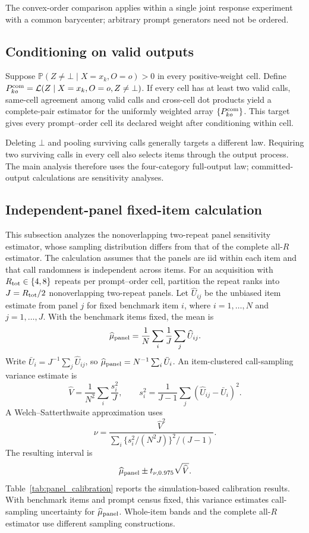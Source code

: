 \documentclass[letterpaper]{article}
\newcommand{\Law}{\mathcal L}
\newcommand{\Prob}{\mathbb P}
\newcommand{\1}{\mathbf 1}
\begin{document}
The convex-order comparison applies within a single joint response experiment
with a common barycenter; arbitrary prompt generators need not be ordered.

\subsection{Conditioning on valid outputs}

Suppose
$\Prob(Z\ne\bot\mid X=x_k,O=o)>0$ in every positive-weight cell. Define
$P_{ko}^{\rm com}=\Law(Z\mid X=x_k,O=o,Z\ne\bot)$. If every cell has at
least two valid calls, same-cell agreement among valid calls and cross-cell
dot products yield a complete-pair estimator for the uniformly weighted
array $\{P_{ko}^{\rm com}\}$. This target gives every prompt--order cell its
declared weight after conditioning within cell.

Deleting $\bot$ and pooling surviving calls generally targets a different law.
Requiring two surviving calls in every cell also selects items through the
output process. The main analysis therefore uses the four-category
full-output law; committed-output calculations are sensitivity analyses.

\subsection{Independent-panel fixed-item calculation}

This subsection analyzes the nonoverlapping two-repeat panel sensitivity
estimator, whose sampling distribution differs from that of the complete
all-$R$ estimator. The calculation assumes that the panels are iid within each
item and that call randomness is independent across items. For an acquisition with
$R_{\rm tot}\in\{4,8\}$ repeats per prompt--order cell, partition the repeat
ranks into $J=R_{\rm tot}/2$ nonoverlapping two-repeat panels. Let
$\widehat U_{ij}$ be the unbiased item estimate from panel $j$ for fixed
benchmark item $i$, where $i=1,\ldots,N$ and $j=1,\ldots,J$. With the
benchmark items fixed, the mean is
\[
\widehat\mu_{\rm panel}
=\frac1N\sum_i\frac1J\sum_j\widehat U_{ij}.
\]
Write $\bar U_i=J^{-1}\sum_j\widehat U_{ij}$, so
$\widehat\mu_{\rm panel}=N^{-1}\sum_i\bar U_i$.
An item-clustered call-sampling variance estimate is
\[
\widehat V
=\frac1{N^2}\sum_i\frac{s_i^2}{J},\qquad
s_i^2=\frac1{J-1}\sum_j
(\widehat U_{ij}-\bar U_i)^2.
\]
A Welch--Satterthwaite approximation uses
\[
\nu=\frac{\widehat V^2}
{\sum_i\{s_i^2/(N^2J)\}^2/(J-1)}.
\]
The resulting interval is
\[
\widehat\mu_{\rm panel}\pm
t_{\nu,0.975}\sqrt{\widehat V}.
\]
Table~\ref{tab:panel_calibration} reports the simulation-based calibration
results. With
benchmark items and prompt census fixed, this variance estimates call-sampling
uncertainty for $\widehat\mu_{\rm panel}$. Whole-item bands and the complete
all-$R$ estimator use different sampling constructions.
\end{document}
